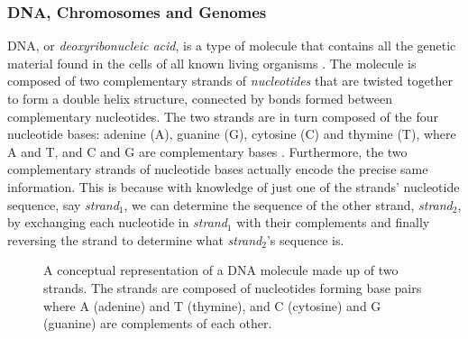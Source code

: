 \subsubsection{DNA, Chromosomes and Genomes} \label{background:biology:dna_chromosomes_and_genomes}

DNA, or \textit{deoxyribonucleic acid}, is a type of molecule that contains all the genetic material found in the cells of all known living organisms \cite{nhgri_dna}. 
The molecule is composed of two complementary strands of \textit{nucleotides} that are twisted together to form a double helix structure, connected by bonds formed between complementary nucleotides.
The two strands are in turn composed of the four nucleotide bases: adenine (A), guanine (G), cytosine (C) and thymine (T), where A and T, and C and G are complementary bases \cite[p.15]{singh}.
Furthermore, the two complementary strands of nucleotide bases actually encode the precise same information.
This is because with knowledge of just one of the strands' nucleotide sequence, say \textit{strand$_1$}, we can determine the sequence of the other strand, \textit{strand$_2$}, by exchanging each nucleotide in \textit{strand$_1$} with their complements and finally reversing the strand to determine what \textit{strand$_2$}'s sequence is.

\begin{figure}[H]
\begin{center}
\caption{A conceptual representation of a DNA molecule made up of two strands. The strands are composed of nucleotides forming base pairs where A (adenine) and T (thymine), and C (cytosine) and G (guanine) are complements of each other.}
\label{background:dna_and_chromosomes:figures:dna_strands}
\end{center}
\end{figure}

